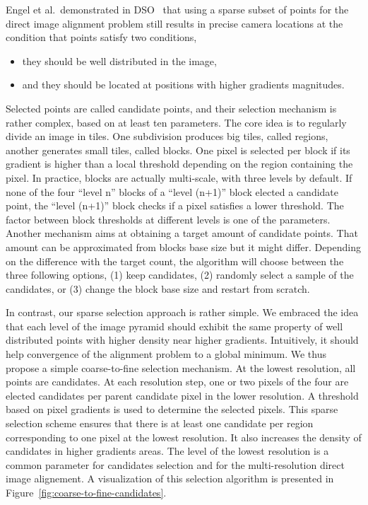 Engel et al.\ demonstrated in DSO~\cite{engel2017direct} that using a sparse subset
of points for the direct image alignment problem still results in precise camera locations
at the condition that points satisfy two conditions,
\begin{itemize}
\setlength\itemsep{-0.5em}
	\item they should be well distributed in the image,
	\item and they should be located at positions with higher gradients magnitudes.
\end{itemize}
Selected points are called candidate points,
and their selection mechanism is rather complex, based on at least ten parameters.
The core idea is to regularly divide an image in tiles.
One subdivision produces big tiles, called regions,
another generates small tiles, called blocks.
One pixel is selected per block if its gradient is higher than a local threshold
depending on the region containing the pixel.
In practice, blocks are actually multi-scale, with three levels by default.
If none of the four ``level n'' blocks of a ``level (n+1)'' block elected a candidate point,
the ``level (n+1)'' block checks if a pixel satisfies a lower threshold.
The factor between block thresholds at different levels is one of the parameters.
Another mechanism aims at obtaining a target amount of candidate points.
That amount can be approximated from blocks base size but it might differ.
Depending on the difference with the target count,
the algorithm will choose between the three following options,
(1) keep candidates, (2) randomly select a sample of the candidates,
or (3) change the block base size and restart from scratch.

In contrast, our sparse selection approach is rather simple.
We embraced the idea that each level of the image pyramid should exhibit
the same property of well distributed points with higher density near higher gradients.
Intuitively, it should help convergence of the alignment problem to a global minimum.
We thus propose a simple coarse-to-fine selection mechanism.
At the lowest resolution, all points are candidates.
At each resolution step, one or two pixels of the four are elected candidates per
parent candidate pixel in the lower resolution.
A threshold based on pixel gradients is used to determine the selected pixels.
This sparse selection scheme ensures that there is at least one candidate per region
corresponding to one pixel at the lowest resolution.
It also increases the density of candidates in higher gradients areas.
The level of the lowest resolution is a common parameter for candidates selection
and for the multi-resolution direct image alignement.
A visualization of this selection algorithm
is presented in Figure~\ref{fig:coarse-to-fine-candidates}.

